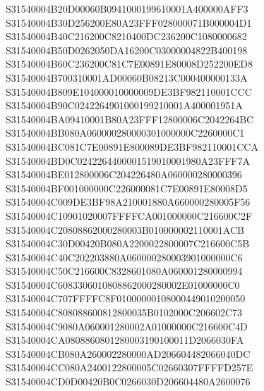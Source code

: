 \documentclass[12pt,a4paper]{article}
\begin{document}
\begin{framed}
{S31540004B20D00060B0941000199610001A400000AFF3\newline
S31540004B30D256200E80A23FFF028000071B000004D1\newline
S31540004B40C216200C8210400DC236200C1080000682\newline
S31540004B50D0262050DA16200C03000004822B400198\newline
S31540004B60C236200C81C7E00891E80008D252200ED8\newline
S31540004B700310001AD00060B08213C000400000133A\newline
S31540004B809E104000010000009DE3BF982110001CCC\newline
S31540004B90C0242264901000199210001A400001951A\newline
S31540004BA09410001B80A23FFF12800006C2042264BC\newline
S31540004BB080A060000280000301000000C2260000C1\newline
S31540004BC081C7E00891E800089DE3BF982110001CCA\newline
S31540004BD0C0242264400001519010001980A23FFF7A\newline
S31540004BE012800006C204226480A060000280000396\newline
S31540004BF001000000C226000081C7E00891E80008D5\newline
S31540004C009DE3BF98A210001880A660000280005F56\newline
S31540004C10901020007FFFFCA001000000C216600C2F\newline
S31540004C20808862000280003B010000002110001ACB\newline
S31540004C30D00420B080A2200022800007C216600C5B\newline
S31540004C40C202203880A060000280003901000000C6\newline
S31540004C50C216600C8328601080A060001280000994\newline
S31540004C6083306010808862000280002E01000000C0\newline
S31540004C707FFFFC8F01000000108000449010200050\newline
S31540004C808088600812800035B0102000C206602C73\newline
S31540004C9080A060001280002A01000000C216600C4D\newline
S31540004CA0808860801280003190100011D2066030FA\newline
S31540004CB080A260002280000AD206604482066040DC\newline
S31540004CC080A2400122800005C02660307FFFFD257E\newline
S31540004CD0D00420B0C0266030D206604480A2600076\newline
}
\end{framed}
\end{document}
